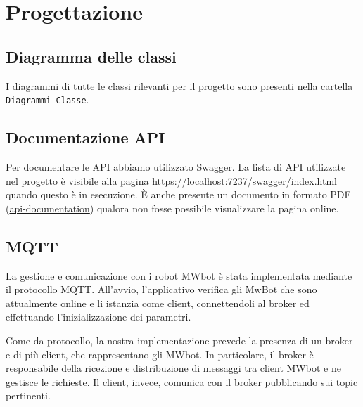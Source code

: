 \documentclass{article}
\begin{document}
\section{Progettazione}
\subsection{Diagramma delle classi}
I diagrammi di tutte le classi rilevanti per il progetto sono presenti nella cartella \texttt{Diagrammi Classe}. 
\subsection{Documentazione API}
Per documentare le API abbiamo utilizzato \href{https://swagger.io}{Swagger}. La lista di API utilizzate nel progetto è visibile alla pagina \url{https://localhost:7237/swagger/index.html} quando questo è in esecuzione. È anche presente un documento in formato PDF (\href{run:./api-documentation.pdf}{api-documentation}) qualora non fosse possibile visualizzare la pagina online.
\subsection{MQTT}
La gestione e comunicazione con i robot MWbot è stata implementata mediante il protocollo MQTT. All'avvio, l'applicativo verifica gli MwBot che sono attualmente online e li istanzia come client, connettendoli al broker ed effettuando l'inizializzazione dei parametri.

Come da protocollo, la nostra implementazione prevede la presenza di un broker e di più client, che rappresentano gli MWbot. In particolare, il broker è responsabile della ricezione e distribuzione di messaggi tra client MWbot e ne gestisce le richieste. Il client, invece, comunica con il broker pubblicando sui topic pertinenti.
\end{document}
